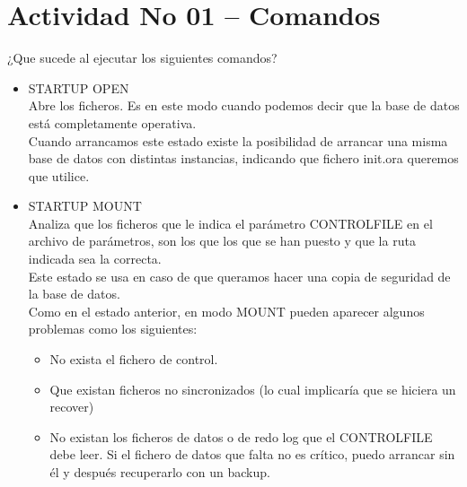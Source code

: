 \section{Actividad No 01 – Comandos} 
¿Que sucede al ejecutar los siguientes comandos? 

\begin{itemize}
\item STARTUP OPEN
	\\Abre los ficheros. Es en este modo cuando podemos decir que la base de datos está
		completamente operativa.
	\\Cuando arrancamos este estado existe la posibilidad de arrancar una misma base de datos
    con distintas instancias, indicando que fichero init.ora queremos que utilice.
	

	\item STARTUP MOUNT
	\\Analiza que los ficheros que le indica el parámetro CONTROLFILE en el archivo de
		parámetros, son los que los que se han puesto y que la ruta indicada sea la correcta.
	\\Este estado se usa en caso de que queramos hacer una copia de seguridad de la base de
		datos.
	\\Como en el estado anterior, en modo MOUNT pueden aparecer algunos problemas como los
		siguientes:
		
		\begin{itemize}
			\item No exista el fichero de control.
			\item Que existan ficheros no sincronizados (lo cual implicaría que se hiciera un 	recover)
			\item No existan los ficheros de datos o de redo log que el CONTROLFILE debe leer. 
			Si el fichero de datos que falta no es crítico, puedo arrancar sin él y después recuperarlo 
			con un backup.
			

\end{itemize}
\end{itemize}
